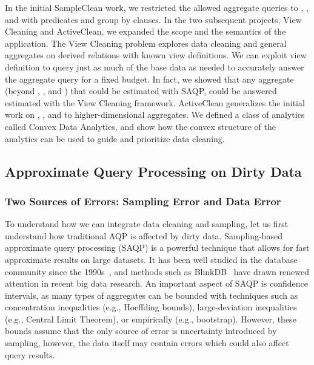 In the initial SampleClean work, we restricted the allowed aggregate queries to \sumfunc, \countfunc, and \avgfunc with predicates and group by clauses.
In the two subsequent projects, View Cleaning and ActiveClean, we expanded the scope and the semantics of the application. 
The View Cleaning problem explores data cleaning and general aggregates on derived relations with known view definitions.
We can exploit view definition to query just as much of the base data as needed to accurately answer the aggregate query for a fixed budget.
In fact, we showed that any aggregate (beyond \sumfunc, \countfunc, and \avgfunc) that could be estimated with SAQP\cite{agarwalknowing}, could be answered estimated with the View Cleaning framework.
ActiveClean generalizes the initial work on \sumfunc, \countfunc, and \avgfunc to higher-dimensional aggregates.
We defined a class of analytics called Convex Data Analytics, and show how the convex structure of the analytics can be used to guide and prioritize data cleaning.

\subsection{Approximate Query Processing on Dirty Data}


\subsubsection{Two Sources of Errors: Sampling Error and Data Error}


To understand how we can integrate data cleaning and sampling, let us first understand how traditional AQP is affected by dirty data.
Sampling-based approximate query processing (SAQP) is a powerful technique that allows for fast approximate results on large datasets. 
It has been well studied in the database community since the 1990s~\cite{DBLP:conf/sigmod/HellersteinHW97,DBLP:conf/sigmod/AcharyaGPR99}, and methods such as BlinkDB~\cite{DBLP:conf/eurosys/AgarwalMPMMS13} have drawn renewed attention in recent big data research. 
An important aspect of SAQP is confidence intervals, as many types of aggregates can be bounded with techniques such as concentration inequalities (e.g., Hoeffding bounds), large-deviation inequalities (e.g., Central Limit Theorem), or empirically (e.g., bootstrap).
However, these bounds assume that the only source of error is uncertainty introduced by sampling, however, the data itself may contain errors which could also affect query results. 


